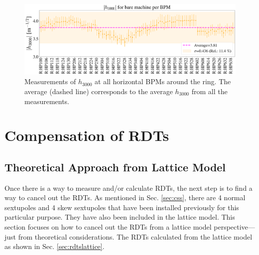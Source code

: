 \begin{figure}[H]
    \centering
    \includegraphics[width=\columnwidth]{chapter4/h3000_bpms.png}
    \caption{Measurements of $h_{3000}$ at all horizontal BPMs around the ring. The average (dashed line) corresponds to the average $h_{3000}$ from all the measurements.}
    \label{fig:h3000_bpms}
\end{figure}

\section{Compensation of RDTs}

\subsection{Theoretical Approach from Lattice Model}

Once there is a way to measure and/or calculate RDTs, the next step is to find a way to cancel out the RDTs. As mentioned in Sec. \ref{sec:css}, there are 4 normal sextupoles and 4 skew sextupoles that have been installed previously for this particular purpose. They have also been included in the lattice model. This section focuses on how to cancel out the RDTs from a lattice model perspective---just from theoretical considerations. The RDTs calculated from the lattice model as shown in Sec. \ref{sec:rdtslattice}.

